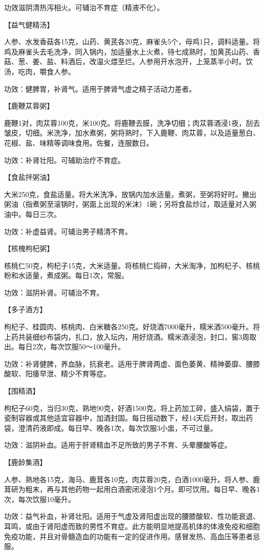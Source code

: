 \documentclass[12pt,UTF8,openany]{ctexbook}
\begin{document}
功效滋阴清热泻相火。可辅治不育症（精液不化）。

【益气健精汤】

人参、水发香菇各15克，山药、黄芪各20克，麻雀头5个，母鸡1只，调料适量。将鸡及麻雀头去毛洗净，同入锅内，加适量水上火煮，待七成熟时，加黄芪山药、香菇、葱、姜、盐、料酒后，改温火煨至烂。人参用开水泡开，上笼蒸半小时。饮汤，吃肉，嚼食人参。

功效：健脾胃，补肾气。适用于脾肾气虚之精子活动力差者。

【鹿鞭苁蓉粥】

鹿鞭1对，肉苁蓉100克，米100克。将鹿鞭去膜，洗净切细；肉苁蓉酒浸1夜，刮去皱皮，切细。米洗净，加水煮粥，粥将熟时，下入鹿鞭、肉苁蓉，以及适量葱白、花椒、盐、味精等调味食用。佐餐，连服数日。

功效：补肾壮阳。可辅助治疗不育症。

【食盐拌粥油】

大米250克，食盐适量。将大米洗净，放锅内加水适量。煮粥，至粥将好时。撇出粥油（指煮粥至滚锅时，粥面上出现的米沫）1碗；另将食盐炒过，取适量对入粥油中。每日三次。

功效：补虚益肾。可辅治男子精清不育。

【核槐枸杞粥】

核桃仁50克，枸杞子15克，大米适量。将核桃仁捣碎，大米淘净，加枸杞子、核桃粉和水适量，煮成粥。每日1次，常服。

功效：滋阴补肾。可辅治不育。

【多子酒方】

枸杞子、桂圆肉、核桃肉、白米糖各250克。好烧酒7000毫升，糯米酒500毫升。将上药共装细纱布袋内，扎口，放入坛内，用好烧酒。糯米酒浸泡，封口，窖3周取出。每日2次，每次饮服50～100毫升。

功效：补肾健脾，养血脉，抗衰老。适用于脾肾两虚、面色萎黄、精神萎靡、腰膝酸软、阳痿早泄、精少不育等症。

【围精酒】

枸杞子60克，当归30克，熟地90克，好酒1500克。将上药加工碎，盛入绢袋，置于瓷制容器或其他适宜容器中，加酒封固。每日摇动数下，经14天后开封，取出药袋，澄清药液即成。每日早、晚各1次，每次饮服3小盅，不可过量。

功效：滋阴补血。适用于肝肾精血不足所致的男子不育、头晕腰酸等症。

【鹿龄集酒】

人参、熟地各15克，海马、鹿茸各10克，肉苁蓉20克，白酒1000毫升。将人参、鹿茸研为粗末，再与其他药物一起用白酒密闭浸泡1个月。即可饮用。每日早、晚各1次，每次饮服10毫升。

功效：益气补血，补肾壮阳。适用于气虚及肾阳虚出现的腰膝酸软、性功能衰退、耳鸣，或由于肾阳虚而致的男性不育症。此方能明显地提高机体的体液免疫和细胞免疫功能，并且对骨髓造血的功能有一定的促进作用。感冒发热、高血压等患者忌服。
\end{document}

